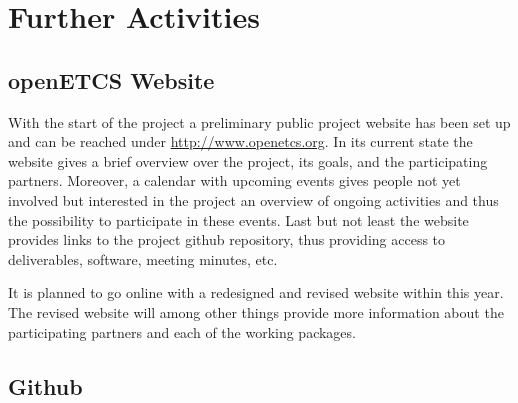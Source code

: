 ﻿\section{Further Activities}\label{sct:further_activities}

\subsection{openETCS Website}
With the start of the project a preliminary public project website has been set up and can be reached under \url{http://www.openetcs.org}. In its current state the website gives a brief overview over the project, its goals, and the participating partners. Moreover, a calendar with upcoming events gives people not yet involved but interested in the project an overview of ongoing activities and thus the possibility to participate in these events. Last but not least the website provides links to the project github repository, thus providing access to deliverables, software, meeting minutes, etc.

It is planned to go online with a redesigned and revised website within this year. The revised website will among other things provide more information about the participating partners and each of the working packages.


\subsection{Github}

\tbc[by TWT]





